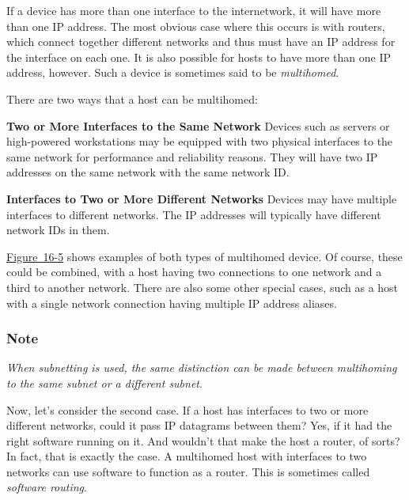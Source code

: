 \documentclass[b5paper,11pt]{memoir}
\begin{document}
If a device has more than one interface to the internetwork, it will
have more than one IP address. The most obvious case where this occurs
is with routers, which connect together different networks and thus must
have an IP address for the interface on each one. It is also possible
for hosts to have more than one IP address, however. Such a device is
sometimes said to be {\emph{multihomed}}.

There are two ways that a host can be multihomed:

{\textbf{Two or More Interfaces to the Same Network}} Devices such as
servers or high-powered workstations may be equipped with two physical
interfaces to the same network for performance and reliability reasons.
They will have two IP addresses on the same network with the same
network ID.

{\textbf{Interfaces to Two or More Different Networks}} Devices may have
multiple interfaces to different networks. The
\protect\hypertarget{ch16s05.htmlux5cux23idx-CHP-16-0669}{}{}IP
addresses will typically have different network IDs in them.

\protect\hyperlink{ch16s06.htmlux5cux23multihomed_devices_on_an_ip_internetwork}{Figure~16-5}
shows examples of both types of multihomed device. Of course, these
could be combined, with a host having two connections to one network and
a third to another network. There are also some other special cases,
such as a host with a single network connection having multiple IP
address aliases.

\subsubsection[Note]{\texorpdfstring{\protect\hypertarget{ch16s05.htmlux5cux23note-63}{}{}Note}{Note}}

{\emph{When subnetting is used, the same distinction can be made between
multihoming to the same subnet or a different subnet}}.

Now, let's consider the second case. If a host has interfaces to two or
more different networks, could it pass IP datagrams between them? Yes,
if it had the right
\protect\hypertarget{ch16s05.htmlux5cux23idx-CHP-16-0670}{}{}software
running on it. And wouldn't that make the host a router, of sorts? In
fact, that is exactly the case. A multihomed host with interfaces to two
networks can use software to function as a router. This is sometimes
called
\protect\hypertarget{ch16s05.htmlux5cux23idx-CHP-16-0671}{}{}{\emph{software
routing}}.
\end{document}
